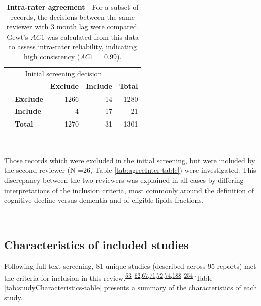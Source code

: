 \documentclass[a4paper, twoside]{templates/ociamthesis}
\begin{document}
\begin{table}[H]

\caption[Inter-rater agreement]{\label{tab:agreeIntra-table}\textbf{Intra-rater agreement} - For a subset of records, the decisions between the same reviewer with 3 month lag were compared. Gewt's \(AC1\) was calculated from this data to assess intra-rater reliability, indicating high consistency (\(AC1\) = 0.99).}
\centering
\begin{tabular}[t]{>{\raggedright\arraybackslash}p{12em}>{}lr>{}r|r}
\toprule
\multicolumn{2}{c}{ } & \multicolumn{3}{c}{Initial screening decision} \\
\cmidrule(l{3pt}r{3pt}){3-5}
\textbf{} & \textbf{} & \textbf{Exclude} & \textbf{Include} & \textbf{Total}\\
\midrule
 & \textbf{Exclude} & 1266 & 14 & 1280\\
\cmidrule{2-5}
 & \textbf{Include} & 4 & 17 & 21\\
\cmidrule{2-5}
\multirow{-3}{12em}{\raggedright\arraybackslash \textbf{Same reviewer decision (with 3 month lag)}} & \textbf{Total} & 1270 & 31 & 1301\\
\bottomrule
\end{tabular}
\end{table}

~

Those records which were excluded in the initial screening, but were included by the second reviewer (N =26, Table \ref{tab:agreeInter-table}) were investigated. This discrepancy between the two reviewers was explained in all cases by differing interpretations of the inclusion criteria, most commonly around the definition of cognitive decline versus dementia and of eligible lipids fractions.

~

\hypertarget{sys-rev-characteristics}{%
\subsection{Characteristics of included studies}\label{sys-rev-characteristics}}

Following full-text screening, 81 unique studies (described across 95 reports) met the criteria for inclusion in this review.\textsuperscript{\protect\hyperlink{ref-kivipelto2005}{53}--\protect\hyperlink{ref-reitz2004}{62},\protect\hyperlink{ref-heartprotectionstudycollaborativegroup2002}{67},\protect\hyperlink{ref-larsson2017}{71},\protect\hyperlink{ref-ostergaard2015}{72},\protect\hyperlink{ref-benn2017}{74},\protect\hyperlink{ref-ridker2008}{188}--\protect\hyperlink{ref-zhu2018}{254}} Table \ref{tab:studyCharacteristics-table} presents a summary of the characteristics of each study.
\end{document}
